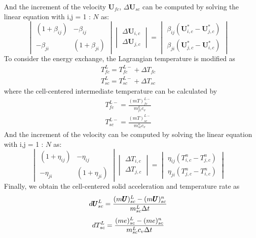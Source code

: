 \documentclass[preprint,12pt]{elsarticle}
\begin{document}
%
%
And the increment of the velocity $\pmb{U}_{fc}$, $\Delta \pmb{U}_{sc}$ can be computed by solving the linear equation with i,j = 1 : $N$ as:
%
%
\[ \begin{vmatrix} (1 + \beta_{ij})  &  -\beta_{ij} \\
                  -\beta_{ji}       &  (1 + \beta_{ji})
    \end {vmatrix}
    \begin{vmatrix} \Delta \pmb{U}_{i,c} \\
                    \Delta \pmb{U}_{j,c}
    \end {vmatrix}
    =
    \begin{vmatrix}  \beta_{ij}(\pmb{U}_{i,c}^{*} - \pmb{U}_{j,c}^{*}) \\
                    \beta_{ji}(\pmb{U}_{j,c}^{*} - \pmb{U}_{i,c}^{*})
    \end {vmatrix}                
\]
%
%
To consider the energy exchange, the Lagrangian temperature  is modified as
%
\begin{equation}
\begin{gathered}
T_{fc}^{L} = T_{fc}^{L-} + \Delta T_{fc} \\
T_{sc}^{L} = T_{sc}^{L-} + \Delta T_{sc}
\end {gathered}
\end {equation}
%
%
where the cell-centered intermediate temperature can be calculated by
%
\begin{equation}
\begin{gathered}
T_{fc}^{L-} = \frac{(m T)_{fc}^{L-}}{m_{fc}^L c_v} \\
T_{sc}^{L-} = \frac{(m T)_{sc}^{L-}}{m_{sc}^L c_v} 
\end {gathered}
\end {equation}
%
%
And the increment of the velocity can be computed by solving the linear equation with i,j = 1 : $N$ as:
%
%
\[ \begin{vmatrix} (1 + \eta_{ij})  &  -\eta_{ij} \\
                  -\eta_{ji}       &  (1 + \eta_{ji})
    \end {vmatrix}
    \begin{vmatrix} \Delta T_{i,c} \\
                    \Delta T_{j,c}
    \end {vmatrix}
    =
    \begin{vmatrix}  \eta_{ij}(T_{i,c}^{n} - T_{j,c}^{n}) \\
                    \eta_{ji}(T_{j,c}^{n} - T_{i,c}^{n})
    \end {vmatrix}                
\]
%
%
Finally, we obtain the cell-centered solid  acceleration and temperature rate as
%
%
\begin{equation}
 d\pmb{U}_{sc}^L = \frac{(m \pmb{U})_{sc}^L - (m \pmb{U})_{sc}^n}{m_{sc}^L \Delta{t}}
\end {equation}
%
\begin{equation}
 dT_{sc}^L = \frac{(me)_{sc}^L - (me)_{sc}^n}{m_{sc}^L c_v \Delta{t}}
\end {equation}
%
%
\end{document}
